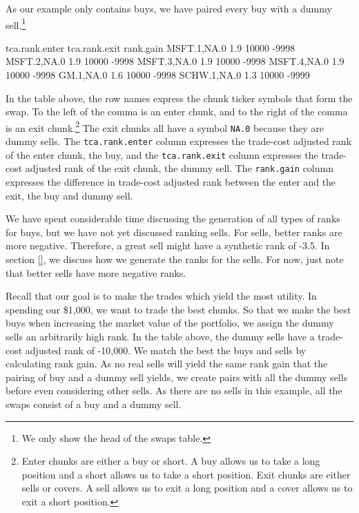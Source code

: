 \documentclass{article}
\begin{document}
As our example only contains buys, we have paired every buy with a
dummy sell.\protect\footnote{We only show the head of the swaps table.}

\begin{Schunk}
\begin{Soutput}
            tca.rank.enter tca.rank.exit rank.gain
MSFT.1,NA.0            1.9         10000     -9998
MSFT.2,NA.0            1.9         10000     -9998
MSFT.3,NA.0            1.9         10000     -9998
MSFT.4,NA.0            1.9         10000     -9998
GM.1,NA.0              1.6         10000     -9998
SCHW.1,NA.0            1.3         10000     -9999
\end{Soutput}
\end{Schunk}

In the table above, the row names express the chunk ticker symbols
that form the swap.  To the left of the comma is an enter chunk, and
to the right of the comma is an exit chunk.\protect\footnote{Enter
chunks are either a buy or short.  A buy allows us to take a long
position and a short allows us to take a short position.  Exit chunks
are either sells or covers.  A sell allows us to exit a long position
and a cover allows us to exit a short position.}  The exit chunks all
have a symbol \texttt{NA.0} because they are dummy sells.  The
\texttt{tca.rank.enter} column expresses the trade-cost adjusted rank
of the enter chunk, the buy, and the \texttt{tca.rank.exit} column
expresses the trade-cost adjusted rank of the exit chunk, the dummy
sell.  The \texttt{rank.gain} column expresses the difference in
trade-cost adjusted rank between the enter and the exit, the buy and
dummy sell.  

We have spent considerable time discussing the generation of all types
of ranks for buys, but we have not yet discussed ranking sells.  For
sells, better ranks are more negative.  Therefore, a great sell might
have a synthetic rank of -3.5.  In section \ref{}, we discuss how
we generate the ranks for the sells.  For now, just note that better
sells have more negative ranks.

Recall that our goal is to make the trades which yield the most
utility.  In spending our \$1,000, we want to trade the best chunks.
So that we make the best buys when increasing the market value of the
portfolio, we assign the dummy sells an arbitrarily high rank.  In the
table above, the dummy sells have a trade-cost adjusted rank of
-10,000.  We match the best the buys and sells by calculating rank
gain.  As no real sells will yield the same rank gain that the pairing
of buy and a dummy sell yields, we create pairs with all the dummy
sells before even considering other sells.  As there are no sells in
this example, all the swaps consist of a buy and a dummy sell.
\end{document}

